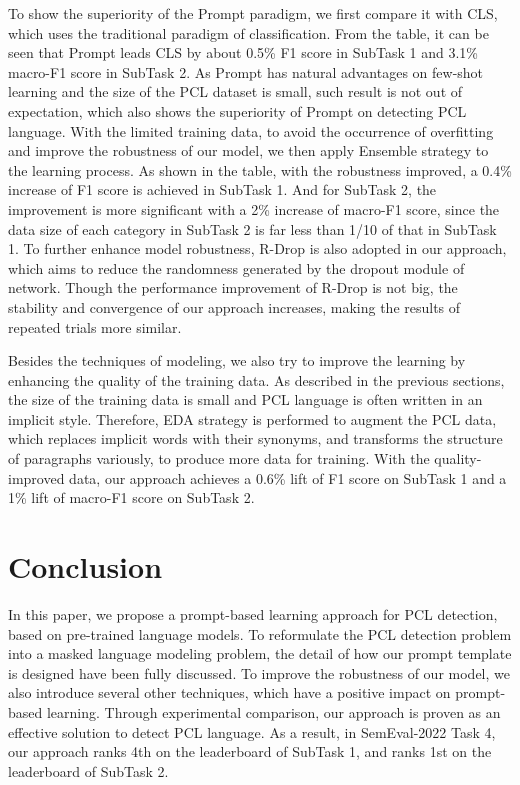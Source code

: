 \documentclass[11pt]{article}
\begin{document}
To show the superiority of the Prompt paradigm, we first compare it with CLS, which uses the traditional paradigm of classification.
From the table, it can be seen that Prompt leads CLS by about 0.5\% F1 score in SubTask 1 and 3.1\% macro-F1 score in SubTask 2.
As Prompt has natural advantages on few-shot learning and the size of the PCL dataset is small, such result is not out of expectation, which also shows the superiority of Prompt on detecting PCL language.
With the limited training data, to avoid the occurrence of overfitting and improve the robustness of our model, we then apply Ensemble strategy to the learning process.
As shown in the table, with the robustness improved, a 0.4\% increase of F1 score is achieved in SubTask 1.
And for SubTask 2, the improvement is more significant with a 2\% increase of macro-F1 score, since the data size of each category in SubTask 2 is far less than 1/10 of that in SubTask 1. 
To further enhance model robustness, R-Drop is also adopted in our approach, which aims to reduce the randomness generated by the dropout module of network. 
Though the performance improvement of R-Drop is not big, the stability and convergence of our approach increases, making the results of repeated trials more similar.

Besides the techniques of modeling, we also try to improve the learning by enhancing the quality of the training data.
As described in the previous sections, the size of the training data is small and PCL language is often written in an implicit style. 
Therefore, EDA strategy is performed to augment the PCL data, which replaces implicit words with their synonyms, and transforms the structure of paragraphs variously, to produce more data for training. 
With the quality-improved data, our approach achieves a  0.6\% lift of F1 score on SubTask 1 and a 1\% lift of macro-F1 score on SubTask 2.  


\section{Conclusion}
In this paper, we propose a prompt-based learning approach for PCL detection, based on pre-trained language models.
To reformulate the PCL detection problem into a masked language modeling problem, the detail of how our prompt template is designed have been fully discussed.
To improve the robustness of our model, we also introduce several other techniques, which have a positive impact on prompt-based learning.
Through experimental comparison, our approach is proven as an effective solution to detect PCL language.
As a result, in SemEval-2022 Task 4, our approach ranks 4th on the leaderboard of SubTask 1, and ranks 1st on the leaderboard of SubTask 2.


\end{document}
